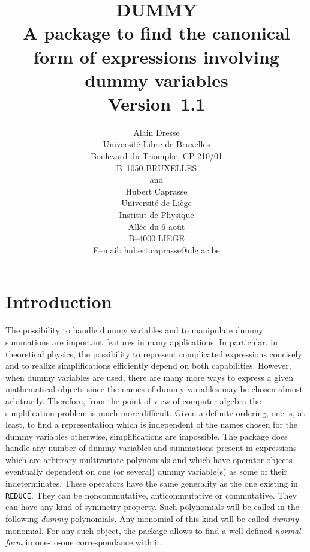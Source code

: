 \newcommand{\nl}{\hfill\newline}
\newcommand{\bq}{\begin{quotation}}
\newcommand{\eq}{\end{quotation}}
\newcommand{\bi}{\begin{itemize}}
\newcommand{\ei}{\end{itemize}}
\date{}
\title{{\bf DUMMY}\\[3pt]
A package to find the canonical form of expressions involving
dummy variables\\[5pt]
  \mbox{\hfill Version 1.1\hfil}}
\author{Alain Dresse \\
Universit\'e Libre de Bruxelles \\
Boulevard du Triomphe, CP 210/01 \\
B--1050 BRUXELLES \\[3pt]
 and \\[5pt]
Hubert Caprasse \\
Universit\'e de Li\`ege \\
Institut de Physique \\
All\'ee du 6 ao\^ut \\
B--4000 LIEGE \\[3pt]
E--mail: hubert.caprasse@ulg.ac.be}

\maketitle
{}
\section{Introduction}
The possibility to handle dummy variables and to manipulate  
dummy summations are important features in many applications. In particular, 
in theoretical physics, the possibility to represent complicated expressions
concisely and to realize simplifications efficiently depend 
on both capabilities.
However, when dummy variables are used, there are many more  ways 
to express a given mathematical objects since 
the names of dummy variables may be chosen  almost arbitrarily.
Therefore, from the point of view of computer algebra
the simplification problem is much more difficult. 
Given a definite ordering, one is, at least, to find a representation which 
is independent of the names chosen for the dummy variables otherwise, 
simplifications are impossible.  
The package does handle any number of dummy variables and summations 
present in expressions which are arbitrary multivariate polynomials  
and which  have operator objects eventually dependent on one (or several) 
dummy variable(s) as some of their indeterminates.
These operators have the same generality as the one existing in {\tt REDUCE}.  
They can be noncommutative, anticommutative or commutative. They can have 
any kind of symmetry property.
Such polynomials will be called in the following {\em dummy} polynomials.
Any monomial of this kind will be called  {\em dummy} monomial.
For any such object, the package allows to find a well defined 
{\em normal form} in one-to-one correspondance with it.

